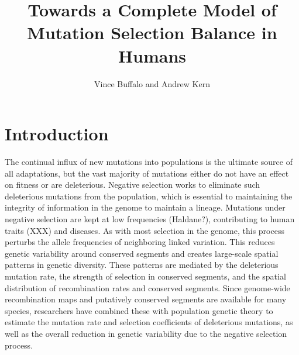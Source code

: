 \documentclass[11pt]{article}
\title{Towards a Complete Model of Mutation Selection Balance in Humans}
\author{Vince Buffalo and Andrew Kern}
\begin{document}
\maketitle



\begin{abstract} 

\end{abstract}


\section*{Introduction}

The continual influx of new mutations into populations is the ultimate source
of all adaptations, but the vast majority of mutations either do not have an
effect on fitness or are deleterious. Negative selection works to eliminate
such deleterious mutations from the population, which is essential to
maintaining the integrity of information in the genome to maintain a lineage.
Mutations under negative selection are kept at low frequencies (Haldane?),
contributing to human traits (XXX) and diseases. As with most selection in the
genome, this process perturbs the allele frequencies of neighboring linked
variation. This reduces genetic variability around conserved segments and
creates large-scale spatial patterns in genetic diversity. These patterns are
mediated by the deleterious mutation rate, the strength of selection in
conserved segments, and the spatial distribution of recombination rates and
conserved segments. Since genome-wide recombination maps and putatively
conserved segments are available for many species, researchers have combined
these with population genetic theory to estimate the mutation rate and
selection coefficients of deleterious mutations, as well as the overall
reduction in genetic variability due to the negative selection process.
\end{document}
